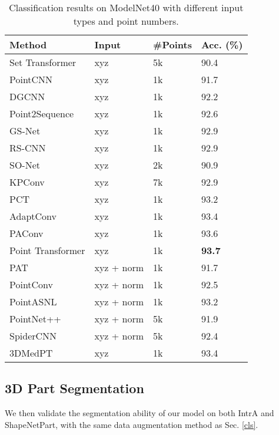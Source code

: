\documentclass[10pt,twocolumn,letterpaper]{article}
\begin{document}
\begin{table} 
\small
\centering
\caption{Classification results on ModelNet40 with different input types and point numbers.
} \label{table:modelnet40_table}
\begin{tabular}{l|lll} 
\toprule
Method       & Input      & \#Points & Acc. (\%)  \\ 
\hline
Set Transformer \cite{lee2019set}    & xyz & 5k       & 90.4       \\
PointCNN \cite{pointcnn}     & xyz        & 1k       & 91.7       \\
DGCNN \cite{wang2019dynamic}         & xyz        & 1k       & 92.2       \\
Point2Sequence \cite{p2seq}   & xyz & 1k       & 92.6       \\
GS-Net \cite{xu2020geometry}        & xyz        & 1k       & 92.9      \\
RS-CNN \cite{rsconv}        & xyz        & 1k       & 92.9      \\
SO-Net \cite{sonet}       & xyz        & 2k       & 90.9       \\
KPConv \cite{thomas2019kpconv}        & xyz        & 7k       & 92.9       \\ 
PCT \cite{guo2020pct}    & xyz  & 1k       & 93.2       \\
AdaptConv \cite{adapconv}           & xyz & 1k & 93.4 \\
PAConv \cite{paconv}                & xyz & 1k & 93.6 \\
Point Transformer \cite{pt}    & xyz & 1k       & \textbf{93.7}        \\
\hline
PAT \cite{pat}          & xyz + norm & 1k       & 91.7       \\
PointConv \cite{wu2019pointconv}     & xyz + norm & 1k       & 92.5       \\
PointASNL \cite{pointasnl}    & xyz + norm & 1k       & 93.2       \\
PointNet++ \cite{qi2017pointnet2}   & xyz + norm & 5k       & 91.9       \\
SpiderCNN \cite{xu2018spidercnn}     & xyz + norm & 5k       & 92.4       \\ 
\hline
3DMedPT         & xyz        & 1k       & 93.4       \\
\bottomrule
\end{tabular}
\end{table}

\subsection{3D Part Segmentation} \label{seg}
We then validate the segmentation ability of our model on both IntrA and ShapeNetPart, with the same data augmentation method as Sec. \ref{cls}.
\end{document}
